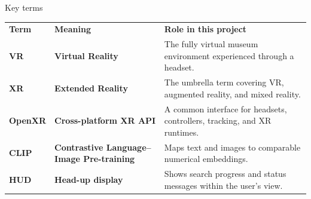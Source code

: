 \begin{frame}[c]{Key terms}
\centering
\small
\renewcommand{\arraystretch}{1.28}
\setlength{\tabcolsep}{0.22cm}

\begin{tabular}{
  @{}
  >{\raggedright\arraybackslash}p{1.55cm}
  >{\raggedright\arraybackslash}p{3.70cm}
  >{\raggedright\arraybackslash}p{6.65cm}
  @{}
}
  \rowcolor{unilightmint}
  \textbf{Term} &
  \textbf{Meaning} &
  \textbf{Role in this project} \\

  \textcolor{unired}{\textbf{VR}} &
  \textbf{Virtual Reality} &
  The fully virtual museum environment experienced through a headset. \\

  \rowcolor{softgrey}
  \textcolor{unired}{\textbf{XR}} &
  \textbf{Extended Reality} &
  The umbrella term covering VR, augmented reality, and mixed reality. \\

  \textcolor{unired}{\textbf{OpenXR}} &
  \textbf{Cross-platform XR API} &
  A common interface for headsets, controllers, tracking, and XR runtimes. \\

  \rowcolor{softgrey}
  \textcolor{unired}{\textbf{CLIP}} &
  \textbf{Contrastive Language--Image Pre-training} &
  Maps text and images to comparable numerical embeddings. \\

  \textcolor{unired}{\textbf{HUD}} &
  \textbf{Head-up display} &
  Shows search progress and status messages within the user's view. \\
\end{tabular}

\end{frame}
